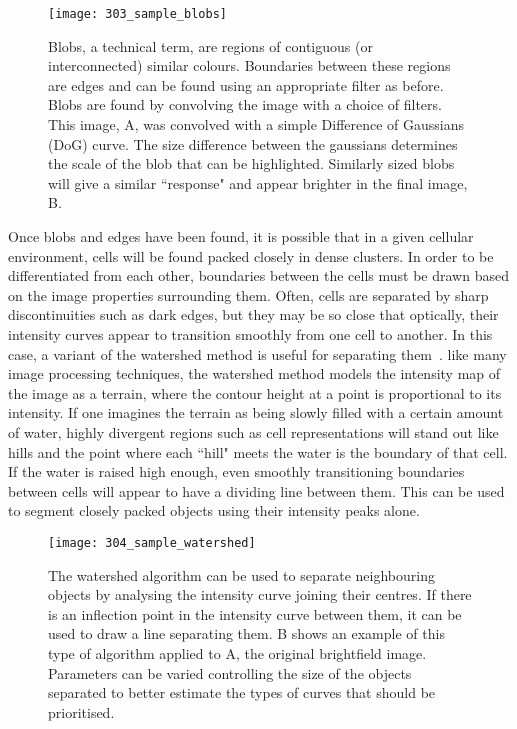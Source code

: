 \begin{figure}[h!]
 \centering
 \texttt{[image: 303\_sample\_blobs]}
 \caption[Sample of blob detection]{
 	Blobs, a technical term, are regions of contiguous (or interconnected) similar colours. Boundaries between these regions are edges and can be found using an appropriate filter as before. Blobs are found by convolving the image with a choice of filters. This image, A, was convolved with a simple Difference of Gaussians (DoG) curve. The size difference between the gaussians determines the scale of the blob that can be highlighted. Similarly sized blobs will give a similar ``response" and appear brighter in the final image, B.
 }
 \label{fig:blob}
\end{figure}

Once blobs and edges have been found, it is possible that in a given cellular environment, cells will be found packed closely in dense clusters. In order to be differentiated from each other, boundaries between the cells must be drawn based on the image properties surrounding them. Often, cells are separated by sharp discontinuities such as dark edges, but they may be so close that optically, their intensity curves appear to transition smoothly from one cell to another. In this case, a variant of the watershed method is useful for separating them~\cite{}. like many image processing techniques, the watershed method models the intensity map of the image as a terrain, where the contour height at a point is proportional to its intensity. If one imagines the terrain as being slowly filled with a certain amount of water, highly divergent regions such as cell representations will stand out like hills and the point where each ``hill" meets the water is the boundary of that cell. If the water is raised high enough, even smoothly transitioning boundaries between cells will appear to have a dividing line between them. This can be used to segment closely packed objects using their intensity peaks alone.

\begin{figure}[h!]
 \centering
 \texttt{[image: 304\_sample\_watershed]}
 \caption[Watershed example]{
 	The watershed algorithm can be used to separate neighbouring objects by analysing the intensity curve joining their centres. If there is an inflection point in the intensity curve between them, it can be used to draw a line separating them. B shows an example of this type of algorithm applied to A, the original brightfield image. Parameters can be varied controlling the size of the objects separated to better estimate the types of curves that should be prioritised.
 }
 \label{fig:watershed}
\end{figure}

